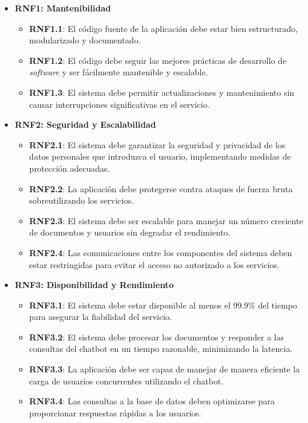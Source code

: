 \begin{itemize}
    \item \textbf{RNF1: Mantenibilidad}
    \begin{itemize}
        \item \textbf{RNF1.1}: El código fuente de la aplicación debe estar bien estructurado, modularizado y documentado.
        \item \textbf{RNF1.2}: El código debe seguir las mejores prácticas de desarrollo de \textit{software} y ser fácilmente mantenible y escalable.
        \item \textbf{RNF1.3}: El sistema debe permitir actualizaciones y mantenimiento sin causar interrupciones significativas en el servicio.
    \end{itemize}
  
    \item \textbf{RNF2: Seguridad y Escalabilidad}
    \begin{itemize}
        \item \textbf{RNF2.1}: El sistema debe garantizar la seguridad y privacidad de los datos personales que introduzca el usuario, implementando medidas de protección adecuadas.
        \item \textbf{RNF2.2}: La aplicación debe protegerse contra ataques de fuerza bruta sobreutilizando los servicios.
        \item \textbf{RNF2.3}: El sistema debe ser escalable para manejar un número creciente de documentos y usuarios sin degradar el rendimiento.
        \item \textbf{RNF2.4}: Las comunicaciones entre los componentes del sistema deben estar restringidas para evitar el acceso no autorizado a los servicios.
    \end{itemize}
  
    \item \textbf{RNF3: Disponibilidad y Rendimiento}
    \begin{itemize}
        \item \textbf{RNF3.1}: El sistema debe estar disponible al menos el 99.9\% del tiempo para asegurar la fiabilidad del servicio.
        \item \textbf{RNF3.2}: El sistema debe procesar los documentos y responder a las consultas del chatbot en un tiempo razonable, minimizando la latencia.
        \item \textbf{RNF3.3}: La aplicación debe ser capaz de manejar de manera eficiente la carga de usuarios concurrentes utilizando el chatbot.
        \item \textbf{RNF3.4}: Las consultas a la base de datos deben optimizarse para proporcionar respuestas rápidas a los usuarios.
    \end{itemize}
  

\end{itemize}
